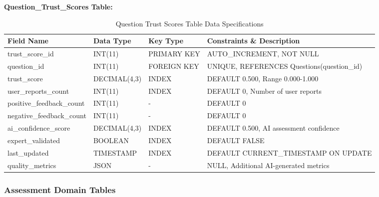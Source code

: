 \documentclass[12pt,a4paper,oneside]{book}
\begin{document}
\textbf{Question\_Trust\_Scores Table:}
\begin{table}[H]
\centering
\caption{Question Trust Scores Table Data Specifications}
\footnotesize
\begin{tabular}{|L{3cm}|L{2.5cm}|L{1.5cm}|L{5cm}|}
\hline
\textbf{Field Name} & \textbf{Data Type} & \textbf{Key Type} & \textbf{Constraints \& Description} \\
\hline
trust\_score\_id & INT(11) & PRIMARY KEY & AUTO\_INCREMENT, NOT NULL \\
\hline
question\_id & INT(11) & FOREIGN KEY & UNIQUE, REFERENCES Questions(question\_id) \\
\hline
trust\_score & DECIMAL(4,3) & INDEX & DEFAULT 0.500, Range 0.000-1.000 \\
\hline
user\_reports\_count & INT(11) & INDEX & DEFAULT 0, Number of user reports \\
\hline
positive\_feedback\_count & INT(11) & - & DEFAULT 0 \\
\hline
negative\_feedback\_count & INT(11) & - & DEFAULT 0 \\
\hline
ai\_confidence\_score & DECIMAL(4,3) & INDEX & DEFAULT 0.500, AI assessment confidence \\
\hline
expert\_validated & BOOLEAN & INDEX & DEFAULT FALSE \\
\hline
last\_updated & TIMESTAMP & INDEX & DEFAULT CURRENT\_TIMESTAMP ON UPDATE \\
\hline
quality\_metrics & JSON & - & NULL, Additional AI-generated metrics \\
\hline
\end{tabular}
\end{table}

\subsubsection{Assessment Domain Tables}
\end{document}
